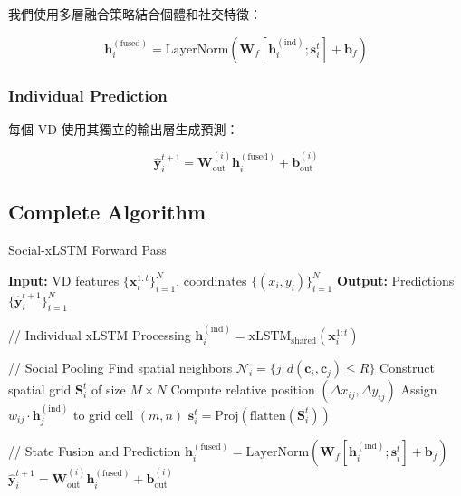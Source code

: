 \documentclass[11pt,a4paper]{article}
\begin{document}
我們使用多層融合策略結合個體和社交特徵：

\begin{equation}
\mathbf{h}_i^{(\text{fused})} = \text{LayerNorm}(\mathbf{W}_f [\mathbf{h}_i^{(\text{ind})}; \mathbf{s}_i^t] + \mathbf{b}_f)
\end{equation}

\subsubsection{Individual Prediction}

每個 VD 使用其獨立的輸出層生成預測：

\begin{equation}
\hat{\mathbf{y}}_i^{t+1} = \mathbf{W}_{\text{out}}^{(i)} \mathbf{h}_i^{(\text{fused})} + \mathbf{b}_{\text{out}}^{(i)}
\end{equation}

\subsection{Complete Algorithm}

\begin{algorithm}
\caption{Social-xLSTM Forward Pass}
\begin{algorithmic}
\STATE \textbf{Input:} VD features $\{\mathbf{x}_i^{1:t}\}_{i=1}^N$, coordinates $\{(x_i, y_i)\}_{i=1}^N$
\STATE \textbf{Output:} Predictions $\{\hat{\mathbf{y}}_i^{t+1}\}_{i=1}^N$

    \STATE // Individual xLSTM Processing
    \STATE $\mathbf{h}_i^{(\text{ind})} = \text{xLSTM}_{\text{shared}}(\mathbf{x}_i^{1:t})$
\ENDFOR

    \STATE // Social Pooling
    \STATE Find spatial neighbors $\mathcal{N}_i = \{j : d(\mathbf{c}_i, \mathbf{c}_j) \leq R\}$
    \STATE Construct spatial grid $\mathbf{S}_i^t$ of size $M \times N$
        \STATE Compute relative position $(\Delta x_{ij}, \Delta y_{ij})$
        \STATE Assign $w_{ij} \cdot \mathbf{h}_j^{(\text{ind})}$ to grid cell $(m, n)$
    \ENDFOR
    \STATE $\mathbf{s}_i^t = \text{Proj}(\text{flatten}(\mathbf{S}_i^t))$
\ENDFOR

    \STATE // State Fusion and Prediction
    \STATE $\mathbf{h}_i^{(\text{fused})} = \text{LayerNorm}(\mathbf{W}_f [\mathbf{h}_i^{(\text{ind})}; \mathbf{s}_i^t] + \mathbf{b}_f)$
    \STATE $\hat{\mathbf{y}}_i^{t+1} = \mathbf{W}_{\text{out}}^{(i)} \mathbf{h}_i^{(\text{fused})} + \mathbf{b}_{\text{out}}^{(i)}$
\ENDFOR
\end{algorithmic}
\end{algorithm}
\end{document}
